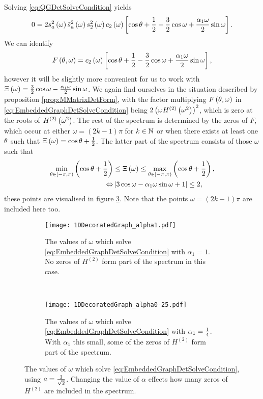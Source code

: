 Solving \eqref{eq:QGDetSolveCondition} yields
\begin{align} \label{eq:EmbeddedGraphDetSolveCondition}
	0 = 2s_a^2\left( \omega \right) \tilde{s}_a^2\left( \omega \right) s_2^2\left( \omega \right) c_2\left( \omega \right)
	\left[  \cos\theta + \frac{1}{2} - \frac{3}{2}\cos\omega + \frac{\alpha_1\omega}{2}\sin\omega  \right].
\end{align}
We can identify 
\begin{align*}
	F\left( \theta,\omega \right) = c_2\left( \omega \right)
	\left[  \cos\theta + \frac{1}{2} - \frac{3}{2}\cos\omega + \frac{\alpha_1\omega}{2}\sin\omega  \right],
\end{align*}
however it will be slightly more convenient for us to work with $\Xi\left( \omega \right) = \frac{3}{2}\cos\omega - \frac{\alpha_1\omega}{2}\sin\omega$.
We again find ourselves in the situation described by proposition \ref{prop:MMatrixDetForm}, with the factor multiplying $F\left( \theta,\omega \right)$ in \eqref{eq:EmbeddedGraphDetSolveCondition} being $2\left(  \omega H^{(2)}\left( \omega^2 \right)  \right)^2$, which is zero at the roots of $H^{(2)}\left( \omega^2 \right)$.
The rest of the spectrum is determined by the zeros of $F$, which occur at either $\omega=(2k-1)\pi$ for $k\in\mathbb{N}$ or when there exists at least one $\theta$ such that $\Xi\left( \omega \right) = \cos\theta + \frac{1}{2}$.
The latter part of the spectrum consists of those $\omega$ such that
\begin{align*}
	\min_{\theta\in\left[-\pi,\pi\right)}\left( \cos\theta + \frac{1}{2} \right) &\leq \Xi\left( \omega \right) 
	\leq \max_{\theta\in\left[-\pi,\pi\right)} \left( \cos\theta + \frac{1}{2} \right), \\
	\Leftrightarrow & \left\lvert  3\cos\omega - \alpha_1\omega\sin\omega + 1  \right\rvert \leq 2, 
\end{align*}
these points are visualised in figure \ref{fig:1DDecoratedGraph}.
Note that the points $\omega=(2k-1)\pi$ are included here too.
\begin{figure}[b!]
	\centering
	\begin{subfigure}[t]{0.45\textwidth}
		\centering
		\texttt{[image: 1DDecoratedGraph\_alpha1.pdf]}
		\caption[]{\label{fig:1DDecoratedGraph_alpha1} The values of $\omega$ which solve \eqref{eq:EmbeddedGraphDetSolveCondition} with $\alpha_1=1$. No zeros of $H^{(2)}$ form part of the spectrum in this case.}
	\end{subfigure}
	~
	\begin{subfigure}[t]{0.45\textwidth}
		\centering
		\texttt{[image: 1DDecoratedGraph\_alpha0-25.pdf]}
		\caption[]{\label{fig:1DDecoratedGraph_alpha0-25} The values of $\omega$ which solve \eqref{eq:EmbeddedGraphDetSolveCondition} with $\alpha_1=\frac{1}{4}$. With $\alpha_1$ this small, some of the zeros of $H^{(2)}$ form part of the spectrum.}
	\end{subfigure}
	\caption[The spectrum of \eqref{eq:ScalarWaveEqn} on the geometry of section \ref{ssec:EmbeddingDependentExample}, and the corresponding poles of the determinant of the $M$-matrix.]{\label{fig:1DDecoratedGraph} The values of $\omega$ which solve \eqref{eq:EmbeddedGraphDetSolveCondition}, using $a=\frac{1}{\sqrt{2}}$. Changing the value of $\alpha$ effects how many zeros of $H^{(2)}$ are included in the spectrum.}
\end{figure}

